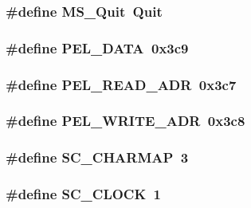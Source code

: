 \label{ID__VL_8H_ae8d720565cd28cc36ed5b5ecd8b12385}
\hypertarget{ID__VL_8H_ad8efcae5e17b4673b60b3f2d46146405}{
\subsubsection[{MS\_\-Quit}]{\setlength{\rightskip}{0pt plus 5cm}\#define MS\_\-Quit~Quit}}
\label{ID__VL_8H_ad8efcae5e17b4673b60b3f2d46146405}
\hypertarget{ID__VL_8H_ab5b9212a0d57fbd06cf0402c33614ffe}{
\subsubsection[{PEL\_\-DATA}]{\setlength{\rightskip}{0pt plus 5cm}\#define PEL\_\-DATA~0x3c9}}
\label{ID__VL_8H_ab5b9212a0d57fbd06cf0402c33614ffe}
\hypertarget{ID__VL_8H_a857d96015db81d60033c25a42a33d8e7}{
\subsubsection[{PEL\_\-READ\_\-ADR}]{\setlength{\rightskip}{0pt plus 5cm}\#define PEL\_\-READ\_\-ADR~0x3c7}}
\label{ID__VL_8H_a857d96015db81d60033c25a42a33d8e7}
\hypertarget{ID__VL_8H_a14ccf92e149d850171920406cd4b425b}{
\subsubsection[{PEL\_\-WRITE\_\-ADR}]{\setlength{\rightskip}{0pt plus 5cm}\#define PEL\_\-WRITE\_\-ADR~0x3c8}}
\label{ID__VL_8H_a14ccf92e149d850171920406cd4b425b}
\hypertarget{ID__VL_8H_a597678356c0e141a803258510f9a6559}{
\subsubsection[{SC\_\-CHARMAP}]{\setlength{\rightskip}{0pt plus 5cm}\#define SC\_\-CHARMAP~3}}
\label{ID__VL_8H_a597678356c0e141a803258510f9a6559}
\hypertarget{ID__VL_8H_a589153f79542568568e6f4dd8d128cac}{
\subsubsection[{SC\_\-CLOCK}]{\setlength{\rightskip}{0pt plus 5cm}\#define SC\_\-CLOCK~1}}
